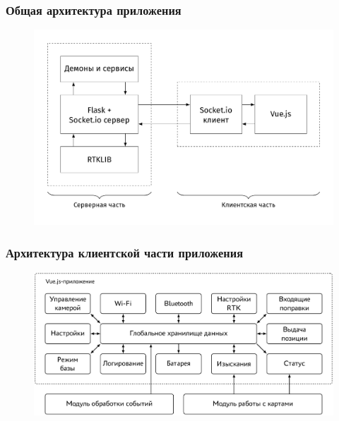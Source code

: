\documentclass[xetex,с,aspectratio=169]{beamer}
\begin{document}
%
%
\begin{frame}
  \frametitle{Общая архитектура приложения}
  \vskip -0.5cm
  \begin{figure}[h]
    \centering
    \includegraphics[width=.75\textwidth]{../img/tikz/system-architecture/pic_sans_no-border}
  \end{figure}
\end{frame}


%
%
\begin{frame}
  \frametitle{Архитектура клиентской части приложения}
  \vskip -0.25cm
  \begin{figure}[h]
    \centering
    \includegraphics[width=.9\textwidth]{../img/tikz/fe-architecture/pic}
  \end{figure}
\end{frame}
\end{document}
